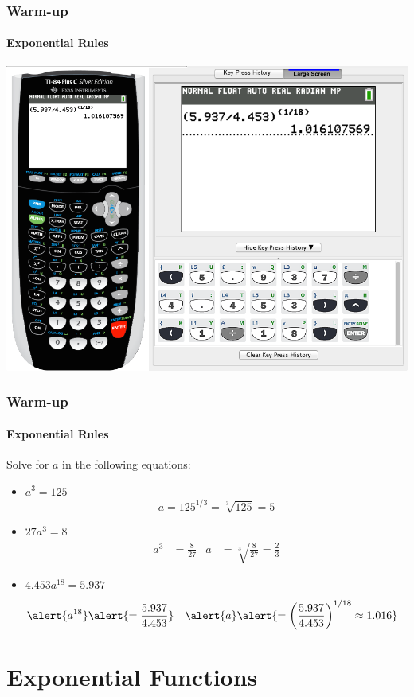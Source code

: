 \documentclass[9pt,xcolor=x11names,compress]{beamer}
\begin{document}
\begin{frame}[c]\frametitle{Warm-up}
\framesubtitle{Exponential Rules}
\begin{center}
\includegraphics[width=0.9\linewidth]{ti84solveExp.png}
\end{center}
\end{frame}

\begin{frame}[c]\frametitle{Warm-up}
\framesubtitle{Exponential Rules}
\begin{example}
Solve for $a$ in the following equations:
\begin{itemize}
    \item $a^3 = 125$
    \begin{equation*}
        a = 125^{1/3} = \sqrt[3]{125} = 5
    \end{equation*}
    \item $27 a^3 = 8$
    \begin{align*}
        a^3 & = \frac{8}{27} &
        a & = \sqrt[3]{\frac{8}{27}} = \frac{2}{3}
    \end{align*}
    \item \alert{$4.453a^{18} = 5.937$}
    \begin{align*}
        \alert{a^{18}} & \alert{= \frac{5.937}{4.453}} &
        \alert{a} &\alert{= \bigg(\frac{5.937}{4.453}\bigg)^{1/18} \approx 1.016}
    \end{align*}
\end{itemize}
\end{example}
\end{frame}

\section{Exponential Functions}
\end{document}
